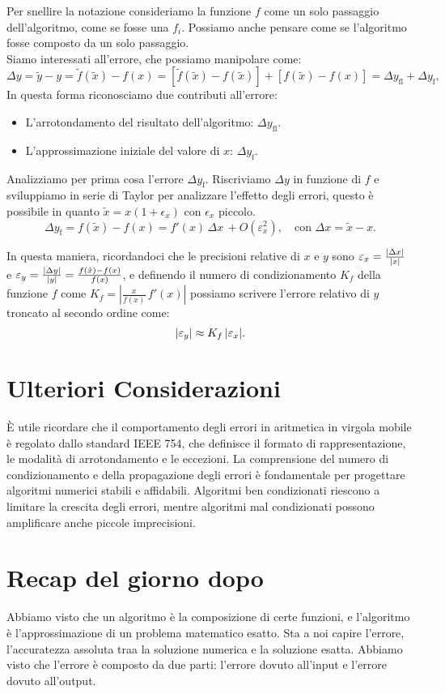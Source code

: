 \documentclass[letterpaper,12pt]{article}
\DeclarePairedDelimiter{\abs}{\lvert}{\rvert} %
\begin{document}
Per snellire la notazione consideriamo la funzione $f$ come un solo passaggio dell'algoritmo, come se fosse una $f_i$. 
Possiamo anche pensare come se l'algoritmo fosse composto da un solo passaggio. \\
Siamo interessati all'errore, che possiamo manipolare come:
\[
\Delta y = \tilde{y} - y = \tilde{f}(\tilde{x}) - f(x) = [\tilde{f}(\tilde{x}) - f(\tilde{x})] + [f(\tilde{x}) - f(x)] = 
 \Delta y_{\operatorname{fl}} + \Delta y_{\operatorname{f}},
\]
In questa forma riconosciamo due contributi all'errore:
\begin{itemize}
    \item L'arrotondamento del risultato dell'algoritmo: $\Delta y_{\operatorname{fl}}$.
    \item L'approssimazione iniziale del valore di $x$: $\Delta y_{\operatorname{f}}$.
\end{itemize}
Analizziamo per prima cosa l'errore $\Delta y_{\operatorname{f}}$. Riscriviamo $\Delta y$ in funzione di $f$ 
e sviluppiamo in serie di Taylor per analizzare l'effetto degli errori, questo è possibile in quanto 
$\tilde{x} = x(1+\epsilon_x)$ con $\epsilon_x$ piccolo.
\[
\Delta y_{\operatorname{f}} = f(\tilde{x}) - f(x) = f'(x)\,\Delta x\, + O(\varepsilon_x^2), \quad \text{con  } 
\Delta x = \tilde{x} - x.
\]

In questa maniera, ricordandoci che le precisioni relative di $x$ e $y$ sono $\varepsilon_x = \frac{\abs{\Delta x}}{\abs{x}}$ e
$\varepsilon_y = \frac{\abs{\Delta y}}{\abs{y}} = \frac{f(\tilde{x}) - f(x)}{f(x)}$, e definendo 
il numero di condizionamento $K_f$ della funzione $f$ come $ K_f = \left|\frac{x}{f(x)}\,f'(x)\right|$ possiamo scrivere 
l'errore relativo di $y$ troncato al secondo ordine come:
\[
\abs{\varepsilon_y} \approx K_f\,\abs{\varepsilon_x}.
\]


\section*{Ulteriori Considerazioni}

È utile ricordare che il comportamento degli errori in aritmetica in virgola mobile è regolato dallo standard IEEE 754, 
che definisce il formato di rappresentazione, le modalità di arrotondamento e le eccezioni. La comprensione del numero 
di condizionamento e della propagazione degli errori è fondamentale per progettare algoritmi numerici stabili e affidabili.
Algoritmi ben condizionati riescono a limitare la crescita degli errori, mentre algoritmi mal condizionati possono 
amplificare anche piccole imprecisioni.

\section{Recap del giorno dopo}
Abbiamo visto che un algoritmo è la composizione di certe funzioni, e l'algoritmo è l'approssimazione di un problema 
matematico esatto. Sta a noi capire l'errore, l'accuratezza assoluta traa la soluzione numerica e la soluzione esatta.
Abbiamo visto che l'errore è composto da due parti: l'errore dovuto all'input e l'errore dovuto all'output. 
\end{document}
